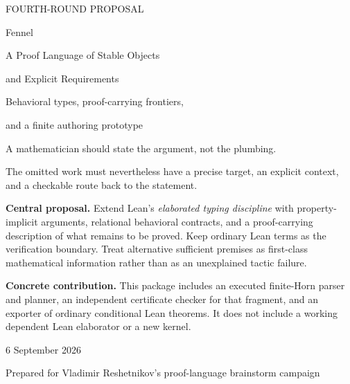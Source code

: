 \documentclass[11pt,a4paper]{article}
\theoremstyle{definition}
\theoremstyle{remark}
\begin{document}
\begin{titlepage}
\vspace*{10mm}
{\color{muted}\large FOURTH-ROUND PROPOSAL\par}
\vspace{8mm}
{\color{ink}\fontsize{44}{48}\selectfont Fennel\par}
\vspace{6mm}
{\LARGE A Proof Language of Stable Objects\par and Explicit Requirements\par}
\vspace{7mm}
{\large Behavioral types, proof-carrying frontiers,\par and a finite authoring prototype\par}
\vspace{11mm}
\begin{principle}
\large A mathematician should state the argument, not the plumbing.\par
\normalsize The omitted work must nevertheless have a precise target,\newline
an explicit context, and a checkable route back to the statement.
\end{principle}
\vspace{8mm}
\textbf{Central proposal.} Extend Lean's \emph{elaborated typing discipline} with
property-implicit arguments, relational behavioral contracts, and a
proof-carrying description of what remains to be proved. Keep ordinary Lean
terms as the verification boundary. Treat alternative sufficient premises as
first-class mathematical information rather than as an unexplained tactic failure.

\textbf{Concrete contribution.} This package includes an executed finite-Horn
parser and planner, an independent certificate checker for that fragment, and
an exporter of ordinary conditional Lean theorems. It does not include a
working dependent Lean elaborator or a new kernel.
\vfill
{\large 6 September 2026\par}
\vspace{2mm}
{\color{muted}Prepared for Vladimir Reshetnikov's proof-language brainstorm campaign\par}
\end{titlepage}
\end{document}
